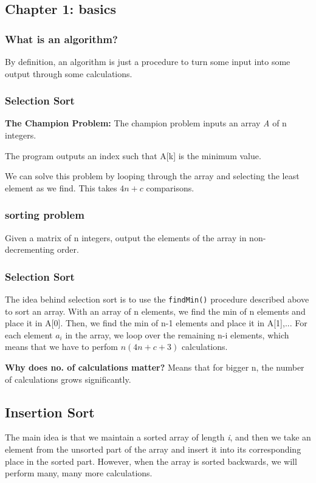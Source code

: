 \documentclass[portrait,10pt,a4paper]{article}
\begin{document}
\raggedright
\begin{multicols*}{3}
\subsection{Chapter 1: basics}

\subsubsection{What is an algorithm?}
By definition, an algorithm is just a procedure to turn some input into some output through some
calculations.

\subsubsection{Selection Sort}
\textbf{The Champion Problem:}
The champion problem inputs an array \textit{A} of n integers.

The program outputs an index such that A[k] is the minimum value.

We can solve this problem by looping through the array and selecting the least element as we find.
This takes $4n+c$ comparisons.
\subsubsection{sorting problem}
Given a matrix of n integers, output the elements of the array in non-decrementing order.
\subsubsection{Selection Sort}
The idea behind selection sort is to use the \texttt{findMin()} procedure described above to sort an array.
With an array of n elements, we find the min of n elements and place it in A[0]. Then, we find the min of 
n-1 elements and place it in A[1],... For each element $a_{i}$ in the array, we loop over the remaining
n-i elements, which means that we have to perfom $n(4n+c+3)$ calculations. 

\textbf{Why does no. of calculations matter?} Means that for bigger n, the number of calculations grows 
significantly.
\subsection{Insertion Sort}
The main idea is that we maintain a sorted array of length \textit{i}, and then we take an element from 
the unsorted part of the array and insert it into its corresponding place in the sorted part. However,
when the array is sorted backwards, we will perform many, many more calculations.


\end{multicols*}
\end{document}
